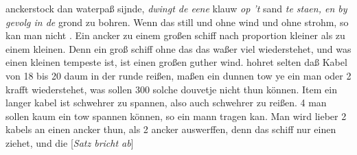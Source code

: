 anckerstock\protect{} dan waterpaß sijnde, \textit{dwingt de eene} klauw\protect{} \textit{op 't} sand \textit{te staen, en by gevolg in de} grond zu bohren. Wenn das  still und ohne wind und ohne strohm, so kan man nicht . Ein ancker\protect{} zu einem großen schiff\protect{} nach proportion kleiner als zu einem kleinen. Denn ein groß schiff\protect{} ohne das das waßer viel wiederstehet, und was einen kleinen tempeste ist, ist einen großen guther wind.\pend \pstart {} hohret selten daß Kabel von 18 bis 20 daum in der runde reißen, maßen ein dunnen tow ye ein man oder 2 krafft wiederstehet, was sollen 300 solche douvetje nicht thun k\"{o}nnen. Item ein langer kabel ist schwehrer zu spannen, also auch schwehrer zu reißen. 4 man sollen kaum ein tow spannen k\"{o}nnen, so ein mann tragen kan. Man wird lieber 2 kabels an einen ancker\protect{} thun, als 2 ancker\protect{} auswerffen, denn das schiff\protect{} nur einen ziehet, und die [\textit{Satz bricht ab}]\pend 
